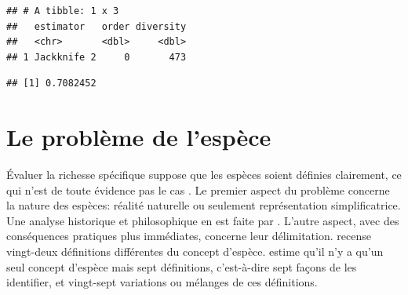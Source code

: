 \documentclass[
  11pt,
  american,
  a4paper,
  extrafontsizes,onecolumn,openright
  ]{memoir}
\newenvironment{Shaded}{\begin{snugshade}}{\end{snugshade}}
\newcommand{\CommentTok}[1]{\textcolor[rgb]{0.56,0.35,0.01}{\textit{#1}}}
\newcommand{\NormalTok}[1]{#1}
\newcommand{\SpecialCharTok}[1]{\textcolor[rgb]{0.00,0.00,0.00}{#1}}
\begin{document}
\begin{verbatim}
## # A tibble: 1 x 3
##   estimator   order diversity
##   <chr>       <dbl>     <dbl>
## 1 Jackknife 2     0       473
\end{verbatim}

\begin{Shaded}
\end{Shaded}

\begin{verbatim}
## [1] 0.7082452
\end{verbatim}

\normalsize

\hypertarget{le-probluxe8me-de-lespuxe8ce}{%
\section{Le problème de l'espèce}\label{le-probluxe8me-de-lespuxe8ce}}

Évaluer la richesse spécifique suppose que les espèces soient définies clairement, ce qui n'est de toute évidence pas le cas \autocite{Casetta2014}.
Le premier aspect du problème concerne la nature des espèces: réalité naturelle ou seulement représentation simplificatrice.
Une analyse historique et philosophique en est faite par \textcite{Richards2010}.
L'autre aspect, avec des conséquences pratiques plus immédiates, concerne leur délimitation.
\textcite{Mayden1997} recense vingt-deux définitions différentes du concept d'espèce.
\textcite{Wilkins2011} estime qu'il n'y a qu'un seul concept d'espèce mais sept définitions, c'est-à-dire sept façons de les identifier, et vingt-sept variations ou mélanges de ces définitions.
\end{document}
